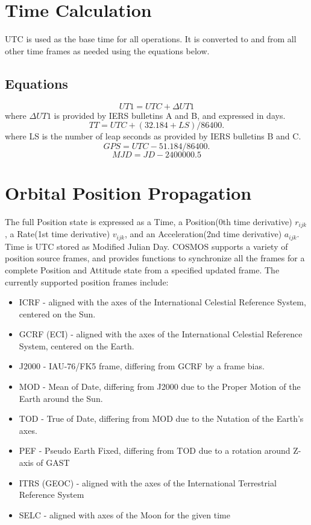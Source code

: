 \documentclass[12pt,letterpaper]{paper}
\begin{document}
\section{Time Calculation}
UTC is used as the base time for all operations. It is converted to and from all other time frames as needed using the equations below.
\subsection{Equations}
\begin{equation}
UT1 = UTC + {\Delta}UT1
\end{equation}
where ${\Delta}UT1$ is provided by IERS bulletins A and B, and expressed in days.
\begin{equation}
TT = UTC + (32.184 + LS)/86400.
\end{equation}
where LS is the number of leap seconds as provided by IERS bulletins B and C.
\begin{equation}
GPS = UTC - 51.184/86400.
\end{equation}
\begin{equation}
MJD = JD - 2400000.5
\end{equation}

\section{Orbital Position Propagation}
The full Position state is expressed as a Time, a Position(0th time derivative) ${r}_{ijk}$, a Rate(1st time derivative) ${v}_{ijk}$, and an Acceleration(2nd time derivative) ${a}_{ijk}$. Time is UTC stored as Modified Julian Day. COSMOS supports a variety of position source frames, and provides functions to synchronize all the frames for a complete Position and Attitude state from a specified updated frame. The currently supported position frames include:
\begin{itemize}
\item ICRF - aligned with the axes of the International Celestial Reference System, centered on the Sun.
\item GCRF (ECI) - aligned with the axes of the International Celestial Reference System, centered on the Earth.
\item J2000 - IAU-76/FK5 frame, differing from GCRF by a frame bias.
\item MOD - Mean of Date, differing from J2000 due to the Proper Motion of the Earth around the Sun.
\item TOD - True of Date, differing from MOD due to the Nutation of the Earth's axes.
\item PEF - Pseudo Earth Fixed, differing from TOD due to a rotation around Z-axis of GAST
\item ITRS (GEOC) - aligned with the axes of the International Terrestrial Reference System
\item SELC - aligned with axes of the Moon for the given time
\end{itemize}
\end{document}
